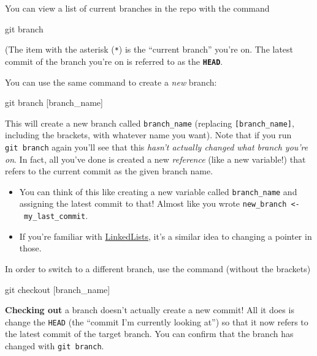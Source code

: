 \documentclass[]{book}
\newenvironment{Shaded}{\begin{snugshade}}{\end{snugshade}}
\newcommand{\FunctionTok}[1]{\textcolor[rgb]{0.00,0.00,0.00}{#1}}
\newcommand{\NormalTok}[1]{#1}
\theoremstyle{definition}
\theoremstyle{definition}
\theoremstyle{remark}
\begin{document}
You can view a list of current branches in the repo with the command

\begin{Shaded}
\begin{Highlighting}[]
\FunctionTok{git}\NormalTok{ branch}
\end{Highlighting}
\end{Shaded}

(The item with the asterisk (\texttt{*}) is the ``current branch''
you're on. The latest commit of the branch you're on is referred to as
the \textbf{\texttt{HEAD}}.

You can use the same command to create a \emph{new} branch:

\begin{Shaded}
\begin{Highlighting}[]
\FunctionTok{git}\NormalTok{ branch [branch_name]}
\end{Highlighting}
\end{Shaded}

This will create a new branch called \texttt{branch\_name} (replacing
\texttt{{[}branch\_name{]}}, including the brackets, with whatever name
you want). Note that if you run \texttt{git\ branch} again you'll see
that this \emph{hasn't actually changed what branch you're on}. In fact,
all you've done is created a new \emph{reference} (like a new variable!)
that refers to the current commit as the given branch name.

\begin{itemize}
\item
  You can think of this like creating a new variable called
  \texttt{branch\_name} and assigning the latest commit to that! Almost
  like you wrote \texttt{new\_branch\ \textless{}-\ my\_last\_commit}.
\item
  If you're familiar with
  \href{https://en.wikipedia.org/wiki/Linked_list}{LinkedLists}, it's a
  similar idea to changing a pointer in those.
\end{itemize}

In order to switch to a different branch, use the command (without the
brackets)

\begin{Shaded}
\begin{Highlighting}[]
\FunctionTok{git}\NormalTok{ checkout [branch_name]}
\end{Highlighting}
\end{Shaded}

\textbf{Checking out} a branch doesn't actually create a new commit! All
it does is change the \texttt{HEAD} (the ``commit I'm currently looking
at'') so that it now refers to the latest commit of the target branch.
You can confirm that the branch has changed with \texttt{git\ branch}.
\end{document}
